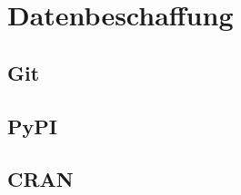 \section{Datenbeschaffung}
\label{sec:datenbeschaffung}
\subsection{Git}
\label{subsec:datenbeschaffung_git}
\subsection{PyPI} %
\label{subsec:datenbeschaffung_pypi}
\subsection{CRAN} %
\label{subsec:datenbeschaffung_cran}
